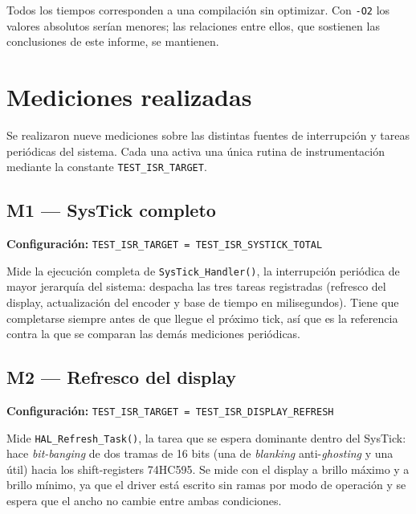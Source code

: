 \documentclass[11pt,a4paper]{article}
\begin{document}
Todos los tiempos corresponden a una compilación sin optimizar. Con
\texttt{-O2} los valores absolutos serían menores; las relaciones entre
ellos, que sostienen las conclusiones de este informe, se mantienen.

\newpage
\section{Mediciones realizadas}

Se realizaron nueve mediciones sobre las distintas fuentes de interrupción y
tareas periódicas del sistema. Cada una activa una única rutina de
instrumentación mediante la constante \texttt{TEST\_ISR\_TARGET}.

\subsection{M1 --- SysTick completo}
\textbf{Configuración:} \texttt{TEST\_ISR\_TARGET = TEST\_ISR\_SYSTICK\_TOTAL}

Mide la ejecución completa de \texttt{SysTick\_Handler()}, la interrupción
periódica de mayor jerarquía del sistema: despacha las tres tareas
registradas (refresco del display, actualización del encoder y base de
tiempo en milisegundos). Tiene que completarse siempre antes de que llegue
el próximo tick, así que es la referencia contra la que se comparan las
demás mediciones periódicas.

\subsection{M2 --- Refresco del display}
\textbf{Configuración:} \texttt{TEST\_ISR\_TARGET = TEST\_ISR\_DISPLAY\_REFRESH}

Mide \texttt{HAL\_Refresh\_Task()}, la tarea que se espera dominante dentro
del SysTick: hace \textit{bit-banging} de dos tramas de 16 bits (una de
\textit{blanking} anti-\textit{ghosting} y una útil) hacia los
shift-registers 74HC595. Se mide con el display a brillo máximo y a brillo
mínimo, ya que el driver está escrito sin ramas por modo de operación y se
espera que el ancho no cambie entre ambas condiciones.
\end{document}
